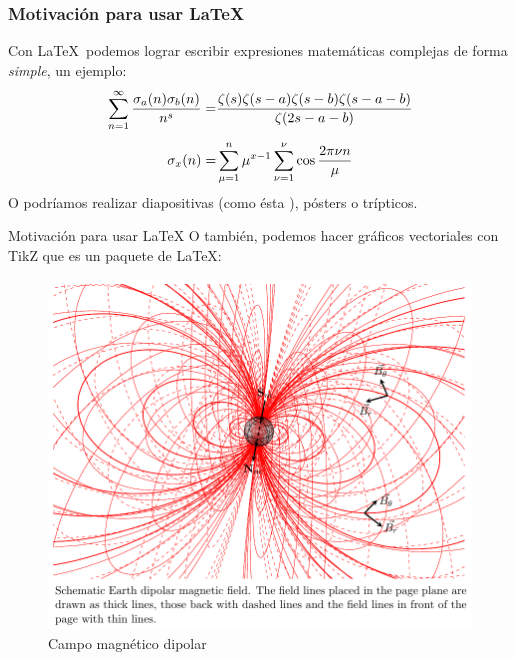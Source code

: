 \documentclass[11pt]{beamer}
\begin{document}
\begin{frame}
\frametitle{Motivación para usar \LaTeX}
Con \LaTeX \, podemos lograr escribir expresiones matemáticas complejas de forma \textit{simple}, un ejemplo:
\begin{eqnarray}
\sum\limits_{n=1}^{\infty} \frac{\sigma_{a}(n) \sigma_{b}(n)}{n^s} =& \displaystyle{\frac{\zeta(s)\zeta(s-a)\zeta(s-b)\zeta(s-a-b)}{\zeta(2s-a-b)}} \\[4pt]
\notag \sigma_{x}(n) =& \sum\limits_{\mu=1}^{n} \mu^{x-1} \sum\limits_{\nu=1}^{\nu} \cos \frac{2\pi\nu n}{\mu}
\end{eqnarray}
O podríamos realizar diapositivas (como ésta \Winkey[1.2][yellow]), pósters o trípticos.
\end{frame}
\begin{frame}{Motivación para usar \LaTeX}
O también, podemos hacer gráficos vectoriales con TikZ que es un paquete de \LaTeX:
\begin{figure}[H]
\includegraphics[scale=0.43]{dipolar-magnetic-field.pdf}
\caption{Campo magnético dipolar}
\end{figure}
\end{frame}
\end{document}
